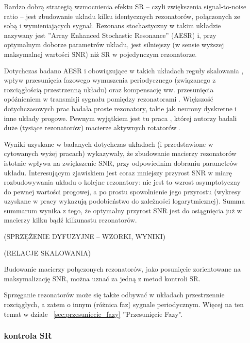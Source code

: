   Bardzo dobrą strategią wzmocnienia efektu SR -- czyli zwiększenia signal-to-noise ratio -- jest zbudowanie układu kilku identycznych rezonatorów, połączonych ze sobą i wymieniających sygnał. Rezonans stochastyczny w takim układzie nazywany jest ''Array Enhanced Stochastic Resonance'' (AESR) \cite{lindner_meadows} i, przy optymalnym doborze parametrów układu, jest silniejszy (w sensie wyższej maksymalnej wartości SNR) niż SR w pojedynczym rezonatorze.

  Dotychczas badano AESR i obowiązujące w takich układach reguły skalowania \cite{lindner_meadows} \cite{tanabe_shimokawa}, wpływ przesunięcia fazowego wymuszenia periodycznego (związanego z rozciągłością przestrzenną układu) \cite{ijmpb_14_8} oraz kompensację ww. przesunięcia opóźnieniem w transmisji sygnału pomiędzy rezonatorami \cite{ijmpb_23_2}. Większość dotychczasowych prac badała proste rezonatory, takie jak neurony dyskretne i inne układy progowe. Pewnym wyjątkiem jest tu praca \cite{tanabe_shimokawa}, której autorzy badali duże (tysiące rezonatorów) macierze aktywnych rotatorów \cite{wiesenfeld} \cite{pakdaman}.

  Wyniki uzyskane w badanych dotychczas układach (i przedstawione w cytowanych wyżej pracach) wykazywały, że zbudowanie macierzy rezonatorów istotnie wpływa na zwiększenie SNR, przy odpowiednim dobraniu parametrów układu. Interesującym zjawiskiem jest coraz mniejszy przyrost SNR w miarę rozbudowywania układu o kolejne rezonatory: nie jest to wzrost asymptotyczny do pewnej wartości progowej, a po prostu spowolnienie jego przyrostu (wykresy uzyskane w pracy \cite{lindner_meadows} wykazują podobieństwo do zależności logarytmicznej). Summa summarum wynika z tego, że optymalny przyrost SNR jest do osiągnięcia już w macierzy kilku bądź kilkunastu rezonatorów.

  (SPRZĘŻENIE DYFUZYJNE -- WZORKI, WYNIKI)

  (RELACJE SKALOWANIA)

  Budowanie macierzy połączonych rezonatorów, jako posunięcie zorientowane na maksymalizację SNR, można uznać za jedną z metod kontroli SR.

  Sprzęganie rezonatorów może się także odbywać w układach przestrzennie rozciągłych, a zatem o innym (różnica faz) sygnale periodycznym. Więcej na ten temat w dziale ~\ref{sec:przesuniecie_fazy} ''Przesunięcie Fazy''.

  \subsubsection{kontrola SR}
  
